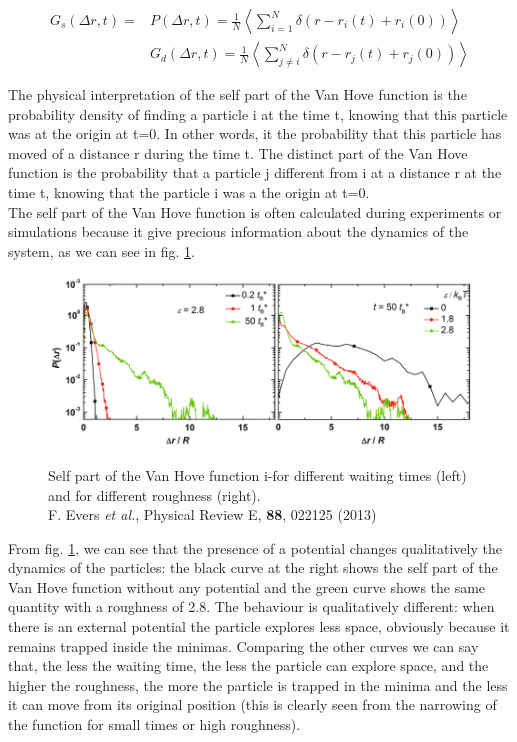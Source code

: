 \documentclass[a4paper,12pt]{article}
\newcommand{\etal}{\textit{et al.}}
\begin{document}
\begin{align}
G_s(\Delta r,t) = &P(\Delta r,t) = \frac{1}{N} \left< \sum_{i=1}^N \delta(r-r_i(t)+r_i(0)) \right>\\
&G_d(\Delta r,t) = \frac{1}{N} \left< \sum_{j\neq i}^N \delta(r-r_j(t)+r_j(0)) \right>
\end{align}

The physical interpretation of the self part of the Van Hove function is the probability density of finding a particle i at the time t, knowing that this particle was at the origin at t=0. In other words, it the probability that this particle has moved of a distance r during the time t. The distinct part of the Van Hove function is the probability that a particle j different from i at a distance r at the time t, knowing that the particle i was a the origin at t=0.\\
The self part of the Van Hove function is often calculated during experiments or simulations because it give precious information about the dynamics of the system, as we can see in fig. \ref{spvhf exp}.

\begin{figure}[htbp]
\centering
\subfigure
{\includegraphics[width=14cm]{pics/spvhf_exp.png}}
\caption{Self part of the Van Hove function i-for different waiting times (left) and for different roughness (right).
\\F. Evers \etal, Physical Review E, \textbf{88}, 022125 (2013)}
\label{spvhf exp}
\end{figure}

From fig. \ref{spvhf exp}, we can see that the presence of a potential changes qualitatively the dynamics of the particles: the black curve at the right shows the self part of the Van Hove function without any potential and the green curve shows the same quantity with a roughness of 2.8. The behaviour is qualitatively different: when there is an external potential the particle explores less space, obviously because it remains trapped inside the minimas. Comparing the other curves we can say that, the less the waiting time, the less the particle can explore space, and the higher the roughness, the more the particle is trapped in the minima and the less it can move from its original position (this is clearly seen from the narrowing of the function for small times or high roughness).
\end{document}
